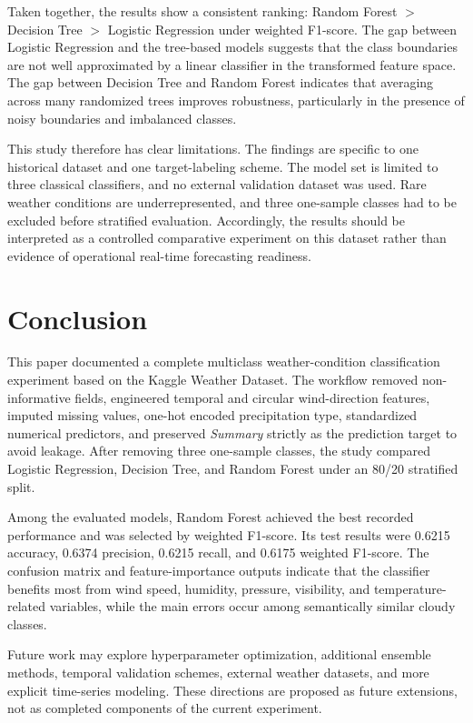 \documentclass[10pt,letterpaper,twocolumn]{article}
\begin{document}
Taken together, the results show a consistent ranking: Random Forest $>$ Decision Tree $>$ Logistic Regression under weighted F1-score. The gap between Logistic Regression and the tree-based models suggests that the class boundaries are not well approximated by a linear classifier in the transformed feature space. The gap between Decision Tree and Random Forest indicates that averaging across many randomized trees improves robustness, particularly in the presence of noisy boundaries and imbalanced classes.

This study therefore has clear limitations. The findings are specific to one historical dataset and one target-labeling scheme. The model set is limited to three classical classifiers, and no external validation dataset was used. Rare weather conditions are underrepresented, and three one-sample classes had to be excluded before stratified evaluation. Accordingly, the results should be interpreted as a controlled comparative experiment on this dataset rather than evidence of operational real-time forecasting readiness.

\section{Conclusion}

This paper documented a complete multiclass weather-condition classification experiment based on the Kaggle Weather Dataset. The workflow removed non-informative fields, engineered temporal and circular wind-direction features, imputed missing values, one-hot encoded precipitation type, standardized numerical predictors, and preserved \textit{Summary} strictly as the prediction target to avoid leakage. After removing three one-sample classes, the study compared Logistic Regression, Decision Tree, and Random Forest under an 80/20 stratified split.

Among the evaluated models, Random Forest achieved the best recorded performance and was selected by weighted F1-score. Its test results were 0.6215 accuracy, 0.6374 precision, 0.6215 recall, and 0.6175 weighted F1-score. The confusion matrix and feature-importance outputs indicate that the classifier benefits most from wind speed, humidity, pressure, visibility, and temperature-related variables, while the main errors occur among semantically similar cloudy classes.

Future work may explore hyperparameter optimization, additional ensemble methods, temporal validation schemes, external weather datasets, and more explicit time-series modeling. These directions are proposed as future extensions, not as completed components of the current experiment.
\end{document}
